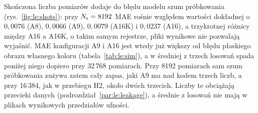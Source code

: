 Skończona liczba pomiarów dodaje do błędu modelu szum próbkowania (rys.~\ref{fig:le:shots}): przy $N_{\mathrm{s}}=8192$ MAE rośnie względem wartości dokładnej o $0{,}0076$ (A8), $0{,}0066$ (A9), $0{,}0079$ (A16K) i $0{,}0237$ (A16), a trzykrotnej różnicy między A16 a A16K, o takim samym rejestrze, pliki wynikowe nie pozwalają wyjaśnić.
MAE konfiguracji A9 i A16 jest wtedy już większy od błędu płaskiego obrazu własnego koloru (tabela~\ref{tab:le:sim}), a w średniej z trzech losowań spada poniżej niego dopiero przy 32\,768 pomiarach.
Przy 8192 pomiarach sam szum próbkowania zużywa zatem cały zapas, jaki A9 ma nad kodem trzech liczb, a przy 16\,384, jak w przebiegu H2, około dwóch trzecich.
Liczby te obciążają przecieki danych (podrozdział~\ref{par:le:leakage}), a średnie z losowań nie mają w plikach wynikowych przedziałów ufności.

